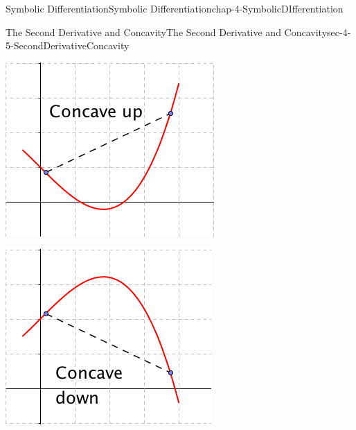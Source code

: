 \documentclass[oneside,10pt,]{book}
\numberwithin{equation}{section}
\begin{document}
\begin{chapterptx}{Symbolic Differentiation}{}{Symbolic Differentiation}{}{}{chap-4-SymbolicDIfferentiation}
\begin{sectionptx}{The Second Derivative and Concavity}{}{The Second Derivative and Concavity}{}{}{sec-4-5-SecondDerivativeConcavity}
\begin{sidebyside}{1}{0.3}{0.3}{0}
\begin{sbspanel}{0.4}
\includegraphics[width=1\linewidth]{images/sec4-5-1.png}
\end{sbspanel}%
\end{sidebyside}%
\begin{sidebyside}{1}{0.3}{0.3}{0}%
\begin{sbspanel}{0.4}%
\includegraphics[width=1\linewidth]{images/sec4-5-2.png}
\end{sbspanel}%
\end{sidebyside}%
\par

\end{sectionptx}
\end{chapterptx}
\end{document}
